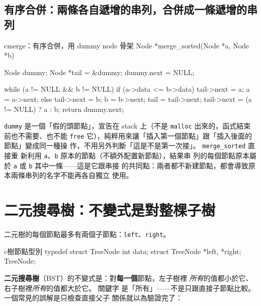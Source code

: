 \subsection[有序合併：兩條遞增串列合併]{有序合併：兩條各自遞增的串列，合併成一條遞增的串列}

\begin{code}{c}{merge：有序合併，用 dummy node 骨架}
Node *merge_sorted(Node *a, Node *b) {
    Node dummy;
    Node *tail = &dummy;
    dummy.next = NULL;

    while (a != NULL && b != NULL) {
        if (a->data <= b->data) {
            tail->next = a;
            a = a->next;
        } else {
            tail->next = b;
            b = b->next;
        }
        tail = tail->next;
    }
    tail->next = (a != NULL) ? a : b;
    return dummy.next;
}
\end{code}

\texttt{dummy} 是一個「假的頭節點」，宣告在 stack 上（不是
\texttt{malloc} 出來的，函式結束前也不需要、也不能 \texttt{free}
它），純粹用來讓「插入第一個節點」跟「插入後面的節點」變成同一種操
作，不用另外判斷「這是不是第一次接」。 \texttt{merge\_sorted} 直接重
新利用 \texttt{a}、\texttt{b} 原本的節點（不額外配置新節點），結果串
列的每個節點原本屬於 \texttt{a} 或 \texttt{b} 其中一條——這是它跟串接
的共同點：兩者都不新建節點，都會導致原本兩條串列的名字不能再各自獨立
使用。


\section{二元搜尋樹：不變式是對整棵子樹}
\label{sec:ds-bst-define}

二元樹的每個節點最多有兩個子節點：\texttt{left}、\texttt{right}。

\begin{code}{c}{樹節點型別}
typedef struct TreeNode {
    int data;
    struct TreeNode *left, *right;
} TreeNode;
\end{code}

\textbf{二元搜尋樹}（BST）的不變式是：對\textbf{每一個}節點，左子樹裡
\textit{所有}的值都小於它、右子樹裡\textit{所有}的值都大於它。 關鍵字
是「所有」——不是只跟直接子節點比較。 一個常見的誤解是只檢查直接父子
關係就以為驗證完了：

